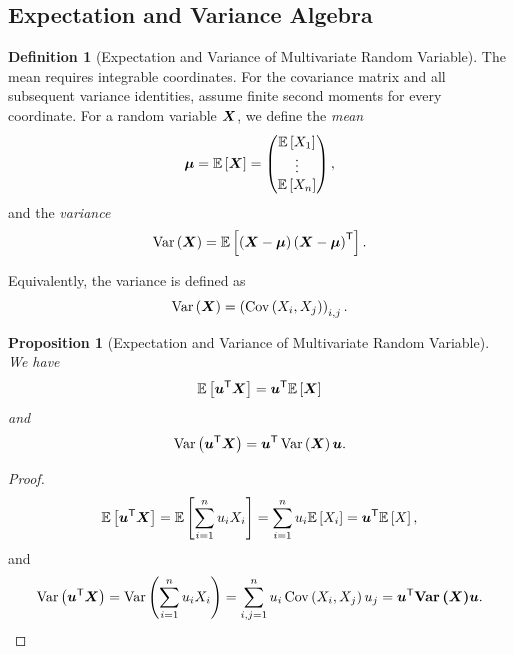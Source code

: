 \documentclass[11pt]{article}
\numberwithin{equation}{section}
\newtheorem{proposition}[theorem]{Proposition}
\theoremstyle{definition}
\newtheorem{definition}[theorem]{Definition}
\theoremstyle{remark}
\newcommand{\pqty}[1]{\left(#1\right)}
\newcommand{\bqty}[1]{\left[#1\right]}
\newcommand{\transpose}{^{\mathsf T}}
\newcommand{\Expt}{\mathbb E}
\DeclareMathOperator{\Var}{Var}
\DeclareMathOperator{\Cov}{Cov}
\newcommand{\pmqty}[1]{\begin{pmatrix}#1\end{pmatrix}}
\begin{document}
\subsection{Expectation and Variance Algebra}

\begin{definition}[Expectation and Variance of Multivariate Random Variable]\label{probability-definition-058}
    \label{probability-def:expt-var-multivariate}%
The mean requires integrable coordinates. For the covariance matrix and all subsequent variance identities, assume finite second moments for every coordinate.
    For a random variable \(\vb{X}\), we define the \emph{mean}
    \[
        \vb*{\mu} = \Expt\bqty{\vb{X}} = \pmqty{\Expt\bqty{X_1} \\ \vdots \\ \Expt\bqty{X_n}},
    \]
    and the \emph{variance}
    \[
        \Var\pqty{\vb{X}} = \Expt\bqty{\pqty{\vb{X} - \vb*{\mu}} \pqty{\vb{X} - \vb*{\mu}}\transpose}.
    \]

    Equivalently, the variance is defined as
    \[
        \Var\pqty{\vb{X}} = \pqty{\Cov\pqty{X_i, X_j}}_{i, j}.
    \]
\end{definition}

\begin{proposition}[Expectation and Variance of Multivariate Random Variable]\label{probability-proposition-040}
    \label{probability-prop:expt-var-transform-multivariate-rv}%
    We have
    \[
        \Expt\bqty{\vb{u} \transpose \vb{X}} = \vb{u}\transpose \Expt\bqty{\vb{X}}
    \]
    and
    \[
        \Var\pqty{\vb{u} \transpose \vb{X}} = \vb{u}\transpose \Var\pqty{\vb{X}} \vb{u}.
    \]
\end{proposition}

\begin{proof}\label{probability-proof-072}
    \[
        \Expt\bqty{\vb{u} \transpose \vb{X}} = \Expt\bqty{\sum_{i = 1}^{n} u_i X_i} = \sum_{i = 1}^{n} u_i \Expt\bqty{X_i} = \vb{u}\transpose \Expt\bqty{X},
    \]
    and
    \[
        \Var\pqty{\vb{u} \transpose \vb{X}} = \Var\pqty{\sum_{i = 1}^{n} u_i X_i} = \sum_{i, j = 1}^{n} u_i \Cov\pqty{X_i, X_j} u_j = \vb{u}\transpose \vb{\Var\pqty{\vb{X}}} \vb{u}. 
    \]
\end{proof}
\end{document}
